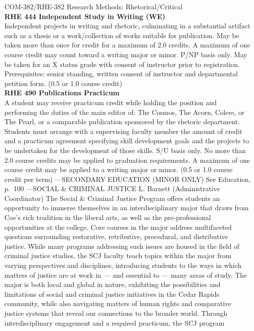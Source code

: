 \documentclass[
  letterpaper,
]{scrbook}
\begin{document}
COM-382/RHE-382 Research Methods: Rhetorical/Critical\\
\textbf{RHE 444 Independent Study in Writing (WE)}\\
Independent projects in writing and rhetoric, culminating in a
substantial artifact such as a thesis or a work/collection of works
suitable for publication. May be taken more than once for credit for a
maximum of 2.0 credits. A maximum of one course credit may count toward
a writing major or minor. P/NP basis only. May be taken for an X status
grade with consent of instructor prior to registration. Prerequisites:
senior standing, written consent of instructor and departmental petition
form. (0.5 or 1.0 course credit)\\
\textbf{RHE 490 Publications Practicum}\\
A student may receive practicum credit while holding the position and
performing the duties of the main editor of: The Cosmos, The Acorn,
Colere, or The Pearl, or a comparable publication sponsored by the
rhetoric department. Students must arrange with a supervising faculty
member the amount of credit and a practicum agreement specifying skill
development goals and the projects to be undertaken for the development
of those skills. S/U basis only. No more than 2.0 course credits may be
applied to graduation requirements. A maximum of one course credit may
be applied to a writing major or minor. (0.5 or 1.0 course credit per
term) ---SECONDARY EDUCATION (MINOR ONLY) See Education, p.~100
---SOCIAL \& CRIMINAL JUSTICE L. Barnett (Administrative Coordinator)
The Social \& Criminal Justice Program offers students an opportunity to
immerse themselves in an interdisciplinary major that draws from Coe's
rich tradition in the liberal arts, as well as the pre-professional
opportunities at the college. Core courses in the major address
multifaceted questions surrounding restorative, retributive, procedural,
and distributive justice. While many programs addressing such issues are
housed in the field of criminal justice studies, the SCJ faculty teach
topics within the major from varying perspectives and disciplines,
introducing students to the ways in which matters of justice are at work
in --- and essential to --- many areas of study. The major is both local
and global in nature, exhibiting the possibilities and limitations of
social and criminal justice initiatives in the Cedar Rapids community,
while also navigating matters of human rights and comparative justice
systems that reveal our connections to the broader world. Through
interdisciplinary engagement and a required practicum, the SCJ program
\end{document}
